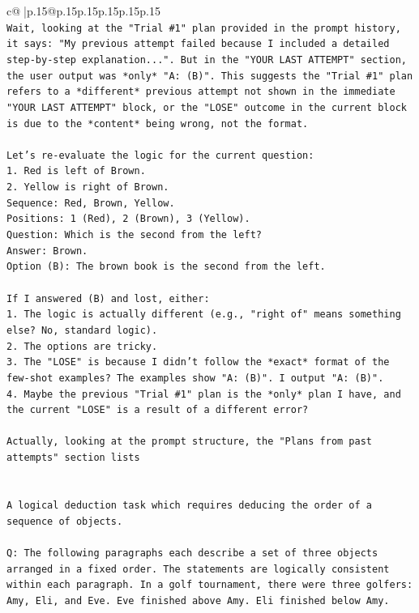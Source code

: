 \documentclass{article}
\begin{document}
{\begin{supertabular}{c@{$\;$}|p{.15\linewidth}@{}p{.15\linewidth}p{.15\linewidth}p{.15\linewidth}p{.15\linewidth}p{.15\linewidth}}
{{{\\ 
\texttt{Wait, looking at the "Trial \#1" plan provided in the prompt history, it says: "My previous attempt failed because I included a detailed step{-}by{-}step explanation...". But in the "YOUR LAST ATTEMPT" section, the user output was *only* "A: (B)". This suggests the "Trial \#1" plan refers to a *different* previous attempt not shown in the immediate "YOUR LAST ATTEMPT" block, or the "LOSE" outcome in the current block is due to the *content* being wrong, not the format.} \\
\\ 
\texttt{Let's re{-}evaluate the logic for the current question:} \\
\texttt{1. Red is left of Brown.} \\
\texttt{2. Yellow is right of Brown.} \\
\texttt{Sequence: Red, Brown, Yellow.} \\
\texttt{Positions: 1 (Red), 2 (Brown), 3 (Yellow).} \\
\texttt{Question: Which is the second from the left?} \\
\texttt{Answer: Brown.} \\
\texttt{Option (B): The brown book is the second from the left.} \\
\\ 
\texttt{If I answered (B) and lost, either:} \\
\texttt{1. The logic is actually different (e.g., "right of" means something else? No, standard logic).} \\
\texttt{2. The options are tricky.} \\
\texttt{3. The "LOSE" is because I didn't follow the *exact* format of the few{-}shot examples? The examples show "A: (B)". I output "A: (B)".} \\
\texttt{4. Maybe the previous "Trial \#1" plan is the *only* plan I have, and the current "LOSE" is a result of a different error?} \\
\\ 
\texttt{Actually, looking at the prompt structure, the "Plans from past attempts" section lists} \\
\\ 
\\ 
\texttt{A logical deduction task which requires deducing the order of a sequence of objects.} \\
\\ 
\texttt{Q: The following paragraphs each describe a set of three objects arranged in a fixed order. The statements are logically consistent within each paragraph. In a golf tournament, there were three golfers: Amy, Eli, and Eve. Eve finished above Amy. Eli finished below Amy.} \\
}}}
\end{supertabular}}
\end{document}
